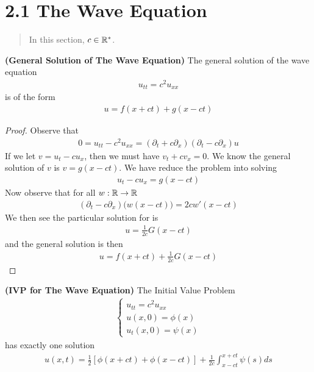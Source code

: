\documentclass{report}
\begin{document}
\section{2.1 The Wave Equation}
\begin{abstract}
In this section, $c\in\mathbb{R}^*$. 
\end{abstract}
\begin{theorem}
\textbf{(General Solution of The Wave Equation)} The general solution of the wave equation 
\begin{align*}
u_{tt}=c^2u_{xx}
\end{align*}
is of the form 
\begin{align*}
u=f(x+ct)+g(x-ct)
\end{align*}
\end{theorem}
\begin{proof}
Observe that 
\begin{align*}
0=u_{tt}-c^2u_{xx}=(\partial_t + c\partial_x)(\partial_t - c\partial_x)u
\end{align*}
If we let $v=u_t-cu_x$, then we must have $v_t+cv_x=0$. We know the general solution of $v$ is $v=g(x-ct)$. We have reduce the problem into solving  
\begin{align}
\label{ime}
u_t-cu_x=g(x-ct)
\end{align}
Now observe that for all $w:\mathbb{R}\rightarrow \mathbb{R}$
\begin{align*}
  (\partial_t - c \partial_x)\big(w(x-ct) \big)=2cw'(x-ct)
\end{align*}
We then see the particular solution for  is 
\begin{align*}
u= \frac{1}{2c}G(x-ct)
\end{align*}
and the general solution is then 
\begin{align*}
u=f(x+ct)+\frac{1}{2c}G(x-ct)
\end{align*}
\end{proof}
\begin{theorem}
\textbf{(IVP for The Wave Equation)} The Initial Value Problem 
\begin{align*}
\begin{cases}
  u_{tt}=c^2u_{xx} \\
  u(x,0)=\phi (x)\\
  u_t(x,0)=\psi (x)
\end{cases}
\end{align*}
has exactly one solution 
\begin{align*}
u(x,t)=\frac{1}{2}[ \phi (x+ct)+\phi (x-ct)]+ \frac{1}{2c}\int_{x-ct}^{x+ct}\psi (s)ds
\end{align*}
\end{theorem}
\end{document}
